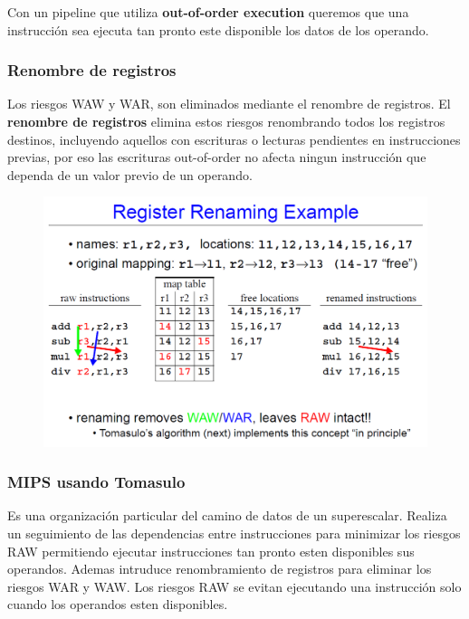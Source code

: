 \documentclass{article}
\begin{document}
Con un pipeline que utiliza \textbf{out-of-order execution} queremos que una instrucción sea ejecuta tan pronto este disponible los datos de los operando.

\subsubsection{Renombre de registros}
Los riesgos WAW y WAR, son eliminados mediante el renombre de registros. El \textbf{renombre de registros} elimina estos riesgos renombrando todos los registros destinos, incluyendo aquellos con escrituras o lecturas pendientes en instrucciones previas, por eso las escrituras out-of-order no afecta ningun instrucción que dependa de un valor previo de un operando. 

\begin{figure}[h!]
    \includegraphics[width=\linewidth]{imagenes/pipeline/ejemplo-renombre.png}
\end{figure}

\newpage
\subsubsection{MIPS usando Tomasulo}

Es una organización particular del camino de datos de un superescalar.
Realiza un seguimiento de las dependencias entre instrucciones para minimizar los riesgos RAW permitiendo ejecutar instrucciones tan pronto esten disponibles sus operandos. Ademas intruduce renombramiento de registros para eliminar los riesgos WAR y WAW.
Los riesgos RAW se evitan ejecutando una instrucción solo cuando los operandos esten disponibles. 
\end{document}
